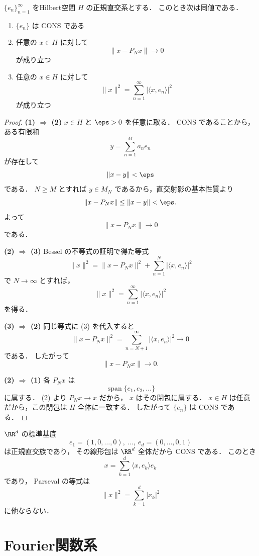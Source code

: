 \begin{theorem}[CONSの特徴づけ]
$\{e_n\}_{n=1}^{\infty}$ をHilbert空間 $H$ の正規直交系とする．
このとき次は同値である．
\begin{enumerate}
    \item $\{e_n\}$ は CONS である
    \item 任意の $x\in H$ に対して
    \[
    \|x-P_Nx\|\to 0
    \]
    が成り立つ
    \item 任意の $x\in H$ に対して
    \[
    \|x\|^2=\sum_{n=1}^{\infty}|\langle x,e_n\rangle|^2
    \]
    が成り立つ
\end{enumerate}
\end{theorem}
\begin{proof}
\textbf{(1) $\Rightarrow$ (2)}\quad
$x\in H$ と $\eps>0$ を任意に取る．
CONS であることから，ある有限和
\[
y=\sum_{n=1}^M a_n e_n
\]
が存在して
\[
\|x-y\|<\eps
\]
である．
$N\ge M$ とすれば $y\in M_N$ であるから，直交射影の基本性質より
\[
\|x-P_Nx\|\le \|x-y\|<\eps.
\]
よって
\[
\|x-P_Nx\|\to 0
\]
である．

\textbf{(2) $\Rightarrow$ (3)}\quad
Bessel の不等式の証明で得た等式
\[
\|x\|^2=\|x-P_Nx\|^2+\sum_{n=1}^N |\langle x,e_n\rangle|^2
\]
で $N\to\infty$ とすれば，
\[
\|x\|^2=\sum_{n=1}^{\infty}|\langle x,e_n\rangle|^2
\]
を得る．

\textbf{(3) $\Rightarrow$ (2)}\quad
同じ等式に (3) を代入すると
\[
\|x-P_Nx\|^2
=
\sum_{n=N+1}^{\infty}|\langle x,e_n\rangle|^2
\to 0
\]
である．
したがって
\[
\|x-P_Nx\|\to 0.
\]

\textbf{(2) $\Rightarrow$ (1)}\quad
各 $P_Nx$ は
\[
\operatorname{span}\{e_1,e_2,\dots\}
\]
に属する．
(2) より $P_Nx\to x$ だから，
$x$ はその閉包に属する．
$x\in H$ は任意だから，この閉包は $H$ 全体に一致する．
したがって $\{e_n\}$ は CONS である．
\end{proof}

\begin{example}
$\RR^d$ の標準基底
\[
e_1=(1,0,\dots,0),\ \dots,\ e_d=(0,\dots,0,1)
\]
は正規直交族であり，
その線形包は $\RR^d$ 全体だから CONS である．
このとき
\[
x=\sum_{k=1}^d \langle x,e_k\rangle e_k
\]
であり，
Parseval の等式は
\[
\|x\|^2=\sum_{k=1}^d |x_k|^2
\]
に他ならない．
\end{example}

\section{Fourier関数系}

